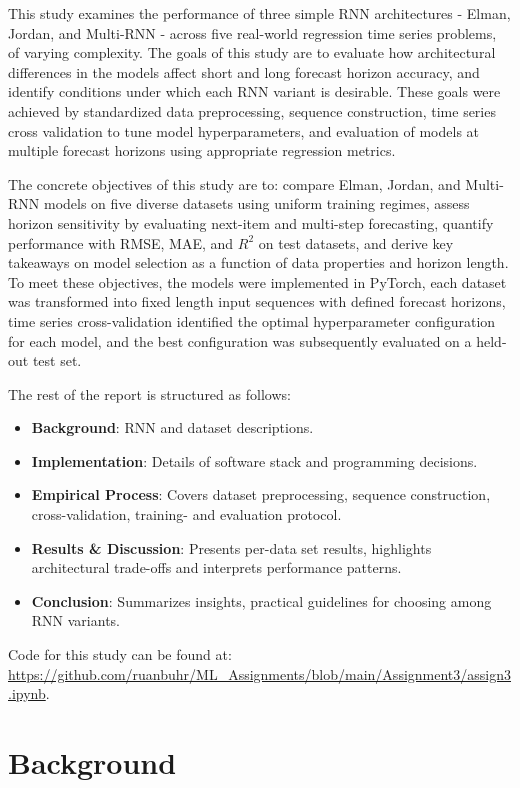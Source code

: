 \documentclass[conference]{IEEEtran}
\begin{document}
This study examines the performance of three simple RNN architectures - Elman, Jordan, and Multi-RNN - across five real-world regression time series problems, of varying complexity. The goals of this study are to evaluate how architectural differences in the models affect short and long forecast horizon accuracy, and identify conditions under which each RNN variant is desirable. These goals were achieved by standardized data preprocessing, sequence construction, time series cross validation to tune model hyperparameters, and evaluation of models at multiple forecast horizons using appropriate regression metrics.

The concrete objectives of this study are to: compare Elman, Jordan, and Multi-RNN models on five diverse datasets using uniform training regimes, assess horizon sensitivity by evaluating next-item and multi-step forecasting, quantify performance with RMSE, MAE, and $R^2$ on test datasets, and derive key takeaways on model selection as a function of data properties and horizon length. To meet these objectives, the models were implemented in PyTorch, each dataset was transformed into fixed length input sequences with defined forecast horizons, time series cross-validation identified the optimal hyperparameter configuration for each model, and the best configuration was subsequently evaluated on a held-out test set.

The rest of the report is structured as follows:

\begin{itemize}
    \item \textbf{Background}: RNN and dataset descriptions.
    \item \textbf{Implementation}: Details of software stack and programming decisions.
    \item \textbf{Empirical Process}: Covers dataset preprocessing, sequence construction, cross-validation, training- and evaluation protocol.
    \item \textbf{Results \& Discussion}: Presents per-data set results, highlights architectural trade-offs and interprets performance patterns.
    \item \textbf{Conclusion}: Summarizes insights, practical guidelines for choosing among RNN variants.
\end{itemize}

Code for this study can be found at: \url{https://github.com/ruanbuhr/ML_Assignments/blob/main/Assignment3/assign3.ipynb}.

\section{\textbf{Background}}
\end{document}
